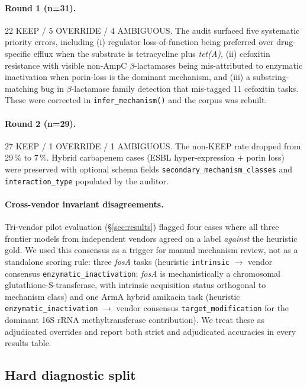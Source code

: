 \documentclass{article}
\begin{document}
\paragraph{Round 1 (n=31).} 22 KEEP / 5 OVERRIDE / 4 AMBIGUOUS. The audit
surfaced five systematic priority errors, including (i) regulator
loss-of-function being preferred over drug-specific efflux when the
substrate is tetracycline plus \emph{tet(A)}, (ii) cefoxitin resistance with
visible non-AmpC $\beta$-lactamases being mis-attributed to enzymatic
inactivation when porin-loss is the dominant mechanism, and (iii) a
substring-matching bug in $\beta$-lactamase family detection that mis-tagged
11 cefoxitin tasks. These were corrected in
\texttt{infer\_mechanism()} and the corpus was rebuilt.

\paragraph{Round 2 (n=29).} 27 KEEP / 1 OVERRIDE / 1 AMBIGUOUS. The non-KEEP
rate dropped from 29\,\% to 7\,\%. Hybrid carbapenem cases (ESBL
hyper-expression $+$ porin loss) were preserved with optional schema fields
\texttt{secondary\_mechanism\_classes} and \texttt{interaction\_type}
populated by the auditor.

\paragraph{Cross-vendor invariant disagreements.} Tri-vendor pilot
evaluation (\S\ref{sec:results}) flagged four cases where all three frontier
models from independent vendors agreed on a label \emph{against} the
heuristic gold. We used this consensus as a trigger for manual mechanism
review, not as a standalone scoring rule: three \emph{fosA} tasks (heuristic
\texttt{intrinsic} $\rightarrow$ vendor consensus
\texttt{enzymatic\_inactivation}; \emph{fosA} is mechanistically a chromosomal
glutathione-S-transferase, with intrinsic acquisition status orthogonal to
mechanism class) and one ArmA hybrid amikacin task (heuristic
\texttt{enzymatic\_inactivation} $\rightarrow$ vendor consensus
\texttt{target\_modification} for the dominant 16S rRNA methyltransferase
contribution). We treat these as adjudicated overrides and report both
strict and adjudicated accuracies in every results table.

\subsection{Hard diagnostic split}
\label{sec:hardsplit}
\end{document}
